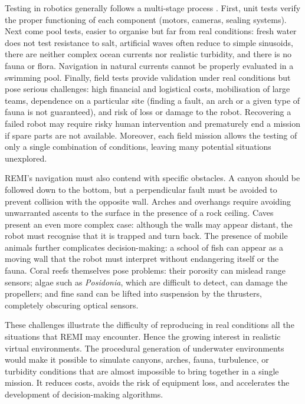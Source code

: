 Testing in robotics generally follows a multi-stage process \cite{GonzalezGarcia2020}. First, unit tests verify the proper functioning of each component (motors, cameras, sealing systems). Next come pool tests, easier to organise but far from real conditions: fresh water does not test resistance to salt, artificial waves often reduce to simple sinusoids, there are neither complex ocean currents nor realistic turbidity, and there is no fauna or flora. Navigation in natural currents cannot be properly evaluated in a swimming pool. Finally, field tests provide validation under real conditions but pose serious challenges: high financial and logistical costs, mobilisation of large teams, dependence on a particular site (finding a fault, an arch or a given type of fauna is not guaranteed), and risk of loss or damage to the robot. Recovering a failed robot may require risky human intervention and prematurely end a mission if spare parts are not available. Moreover, each field mission allows the testing of only a single combination of conditions, leaving many potential situations unexplored.

REMI's navigation must also contend with specific obstacles. A canyon should be followed down to the bottom, but a perpendicular fault must be avoided to prevent collision with the opposite wall. Arches and overhangs require avoiding unwarranted ascents to the surface in the presence of a rock ceiling. Caves present an even more complex case: although the walls may appear distant, the robot must recognise that it is trapped and turn back. The presence of mobile animals further complicates decision-making: a school of fish can appear as a moving wall that the robot must interpret without endangering itself or the fauna. Coral reefs themselves pose problems: their porosity can mislead range sensors; algae such as \textit{Posidonia}, which are difficult to detect, can damage the propellers; and fine sand can be lifted into suspension by the thrusters, completely obscuring optical sensors.

These challenges illustrate the difficulty of reproducing in real conditions all the situations that REMI may encounter. Hence the growing interest in realistic virtual environments. The procedural generation of underwater environments would make it possible to simulate canyons, arches, fauna, turbulence, or turbidity conditions that are almost impossible to bring together in a single mission. It reduces costs, avoids the risk of equipment loss, and accelerates the development of decision-making algorithms.






